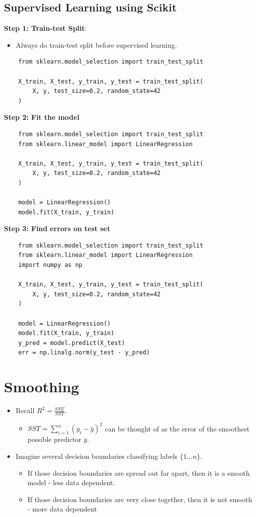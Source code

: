 \documentclass{article}
\begin{document}
\subsection{Supervised Learning using Scikit}

\textbf{Step 1: Train-test Split}:
\begin{itemize}
    \item Always do train-test split before supervised learning.
\end{itemize}
\begin{verbatim}
    from sklearn.model_selection import train_test_split

    X_train, X_test, y_train, y_test = train_test_split(
        X, y, test_size=0.2, random_state=42
    )
\end{verbatim}

\textbf{Step 2: Fit the model}
\begin{verbatim}
    from sklearn.model_selection import train_test_split
    from sklearn.linear_model import LinearRegression
    
    X_train, X_test, y_train, y_test = train_test_split(
        X, y, test_size=0.2, random_state=42
    )
    
    model = LinearRegression()
    model.fit(X_train, y_train)
\end{verbatim}

\textbf{Step 3: Find errors on test set}
\begin{verbatim}
    from sklearn.model_selection import train_test_split
    from sklearn.linear_model import LinearRegression
    import numpy as np
    
    X_train, X_test, y_train, y_test = train_test_split(
        X, y, test_size=0.2, random_state=42
    )
    
    model = LinearRegression()
    model.fit(X_train, y_train)
    y_pred = model.predict(X_test)
    err = np.linalg.norm(y_test - y_pred)
\end{verbatim}

\section{Smoothing}
\begin{itemize}
    \item Recall $R^2 = \frac{SSE}{SST}$.
        \begin{itemize}
            \item $SST = \sum_{i = 1}^n(y_i - \bar{y})^2$ can be thought of as the error of the smoothest possible predictor $\bar{y}$.
        \end{itemize}
    \item Imagine several decision boundaries classifying labels $\{1 \dots n\}$.
    \begin{itemize}
        \item If those decision boundaries are spread out far apart, then it is a smooth model - less data dependent.
        \item  If those decision boundaries are very close together, then it is not smooth - more data dependent
    \end{itemize}
  
\end{itemize}
\end{document}
